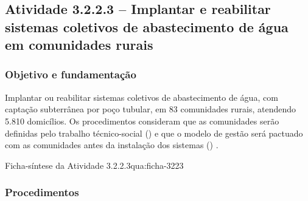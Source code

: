 \subsection{Atividade 3.2.2.3 -- Implantar e reabilitar sistemas coletivos de abastecimento de água em comunidades rurais}
\label{subsec:abastecimento}

\subsubsection{Objetivo e fundamentação}

Implantar ou reabilitar sistemas coletivos de abastecimento de água, com
captação subterrânea por poço tubular, em 83 comunidades rurais, atendendo
5.810 domicílios. Os procedimentos consideram que as comunidades serão
definidas pelo trabalho técnico-social () e que o modelo
de gestão será pactuado com as comunidades antes da instalação dos sistemas
() \cite{mop2026}.

\begin{fichaatividade}{Ficha-síntese da Atividade 3.2.2.3}{qua:ficha-3223}
\end{fichaatividade}

\subsubsection{Procedimentos}

